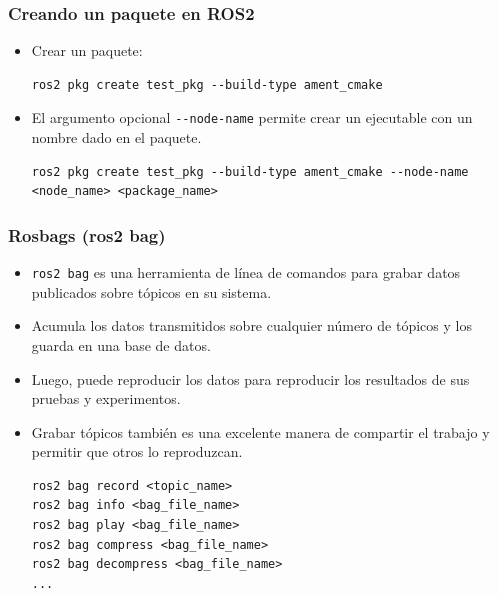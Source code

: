 \begin{frame}[fragile]
	\frametitle{Creando un paquete en ROS2}
    \begin{itemize}
        \item Crear un paquete:
        \begin{lstlisting}[style=bash] 
ros2 pkg create test_pkg --build-type ament_cmake
        \end{lstlisting}

        \item El argumento opcional \lstinline[style=bash]{--node-name} permite crear un ejecutable con un nombre dado en el paquete.
        \begin{lstlisting}[style=bash] 
ros2 pkg create test_pkg --build-type ament_cmake --node-name <node_name> <package_name>
        \end{lstlisting}
    \end{itemize}	
\end{frame}

\begin{frame}[fragile]
	\frametitle{Rosbags (ros2 bag)}
    \begin{itemize}
	   \item \lstinline[style=bash]{ros2 bag} es una herramienta de línea de comandos para grabar datos publicados sobre tópicos en su sistema.
       \item Acumula los datos transmitidos sobre cualquier número de tópicos y los guarda en una base de datos. 
       \item Luego, puede reproducir los datos para reproducir los resultados de sus pruebas y experimentos.
       \item Grabar tópicos también es una excelente manera de compartir el trabajo y permitir que otros lo reproduzcan.

        \begin{lstlisting}[style=bash] 
ros2 bag record <topic_name>
ros2 bag info <bag_file_name>
ros2 bag play <bag_file_name>
ros2 bag compress <bag_file_name>
ros2 bag decompress <bag_file_name>
...
        \end{lstlisting}
    \end{itemize}

	
\end{frame}

